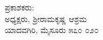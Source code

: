 \thispagestyle{empty}

\begin{center}
ಪ್ರಕಾಶಕರು: \\ಅಧ್ಯಕ್ಷರು, ಶ್ರೀರಾಮಕೃಷ್ಣ ಆಶ್ರಮ\\ಯಾದವಗಿರಿ, ಮೈಸೂರು ೫೭೦ ೦೨೦
\end{center}

